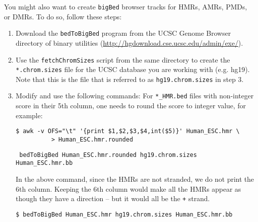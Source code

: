 \documentclass[10pt]{article}
\newcommand{\prog}[1]{\texttt{#1}}
\newcommand{\fn}[1]{\texttt{#1}}
\newcommand{\lit}[1]{\texttt{#1}}
\begin{document}
\noindent
You might also want to create \fn{bigBed} browser tracks for HMRs,
AMRs, PMDs, or DMRs. To do so, follow these steps:
\begin{enumerate}
\item Download the \prog{bedToBigBed} program from the UCSC Genome
  Browser directory of binary utilities
  (\url{http://hgdownload.cse.ucsc.edu/admin/exe/}).
\item Use the \fn{fetchChromSizes} script from the same directory to
  create the \fn{*.chrom.sizes} file for the UCSC database you are
  working with (e.g. hg19). Note that this is the file that is
  referred to as \fn{hg19.chrom.sizes} in step 3.
\item Modify and use the following commands: For \fn{*\_HMR.bed} files
  with non-integer score in their 5th column, one needs to round the
  score to integer value, for example:
\begin{verbatim}
$ awk -v OFS="\t" '{print $1,$2,$3,$4,int($5)}' Human_ESC.hmr \
          > Human_ESC.hmr.rounded
\end{verbatim}

\begin{verbatim}
 bedToBigBed Human_ESC.hmr.rounded hg19.chrom.sizes Human_ESC.hmr.bb
\end{verbatim}

  In the above command, since the HMRs are not stranded, we do not
  print the 6th column. Keeping the 6th column would make all the HMRs
  appear as though they have a direction -- but it would all be the
  \lit{+} strand.
\begin{verbatim}
$ bedToBigBed Human_ESC.hmr hg19.chrom.sizes Human_ESC.hmr.bb
\end{verbatim}
\end{enumerate}

\end{document}
